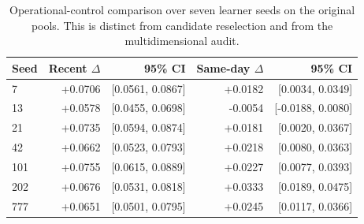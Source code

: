 \begin{table}[!t]
\renewcommand{\arraystretch}{1.10}
\centering
\caption{Operational-control comparison over seven learner seeds on the original pools. This is distinct from candidate reselection and from the multidimensional audit.}
\label{tab:learner_seeds}
\small
\setlength{\tabcolsep}{5pt}
\begin{tabular*}{\linewidth}{@{\extracolsep{\fill}}lrrrr@{}}
\toprule
Seed & Recent $\Delta$ & 95\% CI & Same-day $\Delta$ & 95\% CI \\
\midrule
7 & +0.0706 & [0.0561, 0.0867] & +0.0182 & [0.0034, 0.0349] \\
13 & +0.0578 & [0.0455, 0.0698] & -0.0054 & [-0.0188, 0.0080] \\
21 & +0.0735 & [0.0594, 0.0874] & +0.0181 & [0.0020, 0.0367] \\
42 & +0.0662 & [0.0523, 0.0793] & +0.0218 & [0.0080, 0.0363] \\
101 & +0.0755 & [0.0615, 0.0889] & +0.0227 & [0.0077, 0.0393] \\
202 & +0.0676 & [0.0531, 0.0818] & +0.0333 & [0.0189, 0.0475] \\
777 & +0.0651 & [0.0501, 0.0795] & +0.0245 & [0.0117, 0.0366] \\
\bottomrule
\end{tabular*}
\end{table}
